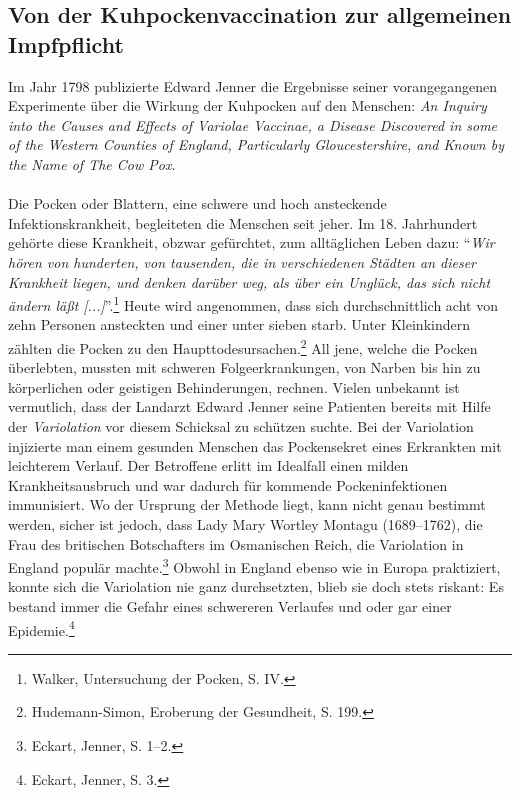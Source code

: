 \documentclass[
    a4paper,
    12pt,
    hyphens,
    chapterprefix=true,
    headheight=33pt,
    footheight=29pt,
    headings=optiontohead, %
]{scrartcl}
\begin{document}
\subsection{Von der Kuhpockenvaccination zur allgemeinen Impfpflicht}
Im Jahr 1798 publizierte Edward Jenner die Ergebnisse seiner vorangegangenen Experimente über die Wirkung der Kuhpocken auf den Menschen: \textit{An Inquiry into the Causes and Effects of Variolae Vaccinae, a Disease Discovered in some of the Western Counties of England, Particularly Gloucestershire, and Known by the Name of The Cow Pox}.\\
\\
Die Pocken oder Blattern, eine schwere und hoch ansteckende Infektionskrankheit, begleiteten die Menschen seit jeher. Im 18. Jahrhundert gehörte diese Krankheit, obzwar gefürchtet, zum alltäglichen Leben dazu: "`\textit{Wir hören von hunderten, von tausenden, die in verschiedenen Städten an dieser Krankheit liegen, und denken darüber weg, als über ein Unglück, das sich nicht ändern läßt [...]}"'.\footnote{Walker, Untersuchung der Pocken, S. IV.}
 Heute wird angenommen, dass sich durchschnittlich acht von zehn Personen ansteckten und einer unter sieben starb. Unter Kleinkindern zählten die Pocken zu den Haupttodesursachen.\footnote{Hudemann-Simon, 
Eroberung der Gesundheit, S. 199.} All jene, welche die Pocken überlebten, mussten mit schweren Folgeerkrankungen, von Narben bis hin zu körperlichen oder geistigen Behinderungen, rechnen. Vielen unbekannt ist vermutlich, dass der Landarzt Edward Jenner seine Patienten bereits mit Hilfe der \textit{Variolation} vor diesem Schicksal zu schützen suchte. Bei der Variolation injizierte man einem gesunden Menschen das Pockensekret eines Erkrankten mit leichterem Verlauf. Der Betroffene erlitt im Idealfall einen milden Krankheitsausbruch und war dadurch für kommende Pockeninfektionen immunisiert. Wo der Ursprung der Methode liegt, kann nicht genau bestimmt werden, sicher ist jedoch, dass Lady Mary Wortley Montagu (1689--1762), die Frau des britischen Botschafters im Osmanischen Reich, die Variolation in England populär machte.\footnote{Eckart, Jenner, S. 1--2.} Obwohl in England ebenso wie in Europa praktiziert, konnte sich die Variolation nie ganz durchsetzten, blieb sie doch stets riskant: Es bestand immer die Gefahr eines schwereren Verlaufes und oder gar einer Epidemie.\footnote{Eckart, Jenner, S. 3.}\\
\end{document}
